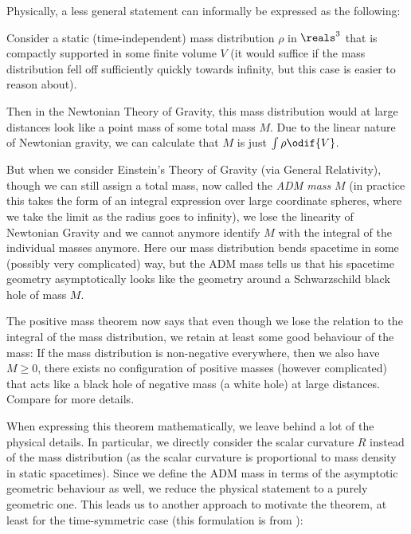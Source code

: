 \documentclass[titlepage,numbers=noenddot,headinclude,oneside,%
footinclude=true,cleardoublepage=empty,%
BCOR=5mm,paper=a4,fontsize=11pt,%
english,%
]{scrartcl}
\begin{document}
Physically, a less general statement can informally be expressed as the following: 

Consider a static (\ie time-independent) mass distribution \( \rho \) in \( \reals^3 \) that is compactly supported in some finite volume \( V \) (it would suffice if the mass distribution fell off sufficiently quickly towards infinity, but this case is easier to reason about).

Then in the Newtonian Theory of Gravity, this mass distribution would at large distances look like a point mass of some total mass \( M \). Due to the linear nature of Newtonian gravity, we can calculate that \( M \) is just \( \int \rho \odif{V} \).

But when we consider Einstein's Theory of Gravity (via General Relativity), though we can still assign a total mass, now called the \emph{ADM mass} \( M \) (in practice this takes the form of an integral expression over large coordinate spheres, where we take the limit as the radius goes to infinity), we lose the linearity of Newtonian Gravity and we cannot anymore identify \( M \) with the integral of the individual masses anymore. Here our mass distribution bends spacetime in some (possibly very complicated) way, but the ADM mass tells us that his spacetime geometry asymptotically looks like the geometry around a Schwarzschild black hole of mass \( M \).

The positive mass theorem now says that even though we lose the relation to the integral of the mass distribution, we retain at least some good behaviour of the mass: If the mass distribution is non-negative everywhere, then we also have \( M\geq 0 \), \ie there exists no configuration of positive masses (however complicated) that acts like a black hole of negative mass (a white hole) at large distances. Compare \cite[Chapter 7]{leeGeometricRelativity2019} for more details.

When expressing this theorem mathematically, we leave behind a lot of the physical details. In particular, we directly consider the scalar curvature \( R \) instead of the mass distribution (as the scalar curvature is proportional to mass density in static spacetimes). Since we define the ADM mass in terms of the asymptotic geometric behaviour as well, we reduce the physical statement to a purely geometric one. This leads us to another approach to motivate the theorem, at least for the time-symmetric case (this formulation is from \cite[page 1]{braySpacetimeHarmonicFunctions2021}):
\end{document}
